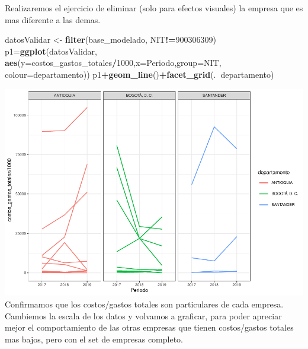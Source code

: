 \documentclass[
  11pt,
]{book}
\newenvironment{Shaded}{\begin{snugshade}}{\end{snugshade}}
\newcommand{\DataTypeTok}[1]{\textcolor[rgb]{0.13,0.29,0.53}{#1}}
\newcommand{\DecValTok}[1]{\textcolor[rgb]{0.00,0.00,0.81}{#1}}
\newcommand{\KeywordTok}[1]{\textcolor[rgb]{0.13,0.29,0.53}{\textbf{#1}}}
\newcommand{\NormalTok}[1]{#1}
\newcommand{\OperatorTok}[1]{\textcolor[rgb]{0.81,0.36,0.00}{\textbf{#1}}}
\newcommand{\StringTok}[1]{\textcolor[rgb]{0.31,0.60,0.02}{#1}}
\begin{document}
Realizaremos el ejercicio de eliminar (solo para efectos visuales) la
empresa que es mas diferente a las demas.

\begin{Shaded}
\begin{Highlighting}[]
\NormalTok{datosValidar <-}\StringTok{ }\KeywordTok{filter}\NormalTok{(base_modelado, NIT}\OperatorTok{!=}\DecValTok{900306309}\NormalTok{)}
\NormalTok{p1=}\KeywordTok{ggplot}\NormalTok{(datosValidar, }\KeywordTok{aes}\NormalTok{(}\DataTypeTok{y=}\NormalTok{costos_gastos_totales}\OperatorTok{/}\DecValTok{1000}\NormalTok{,}\DataTypeTok{x=}\NormalTok{Periodo,}\DataTypeTok{group=}\NormalTok{NIT,}
                            \DataTypeTok{colour=}\NormalTok{departamento))}
\NormalTok{p1}\OperatorTok{+}\KeywordTok{geom_line}\NormalTok{()}\OperatorTok{+}\KeywordTok{facet_grid}\NormalTok{(.}\OperatorTok{~}\NormalTok{departamento)}
\end{Highlighting}
\end{Shaded}

\includegraphics{index_files/figure-latex/unnamed-chunk-35-1.pdf}
Confirmamos que los costos/gastos totales son particulares de cada
empresa. Cambiemos la escala de los datos y volvamos a graficar, para
poder apreciar mejor el comportamiento de las otras empresas que tienen
costos/gastos totales mas bajos, pero con el set de empresas completo.
\end{document}

